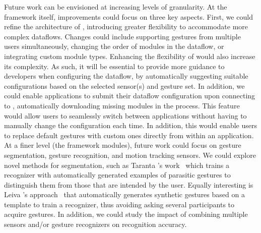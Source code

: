 Future work can be envisioned at increasing levels of granularity. 
%
At the framework itself, improvements could focus on three key aspects.
%
First, we could refine the architecture of \ql, introducing greater flexibility to accommodate more complex dataflows. Changes could include supporting gestures from multiple users simultaneously, changing the order of modules in the dataflow, or integrating custom module types.
%
Enhancing the flexibility of \ql would also increase its complexity. As such, it will be essential to provide more guidance to developers when configuring the dataflow, \eg by automatically suggesting suitable configurations based on the selected sensor(s) and gesture set.
%
In addition, we could enable applications to submit their dataflow configuration upon connecting to \ql, automatically downloading missing modules in the process. This feature would allow users to seamlessly switch between applications without having to manually change the configuration each time. In addition, this would enable users to replace default gestures with custom ones directly from within an application.
%
At a finer level (\ie the framework modules), future work could focus on gesture segmentation, gesture recognition, and motion tracking sensors. We could explore novel methods for segmentation, such as Taranta \etal's work~\cite{Taranta:2017} which trains a recognizer with automatically generated examples of parasitic gestures to distinguish them from those that are intended by the user. Equally interesting is Leiva \etal's approach~\cite{Leiva:2018} that automatically generates synthetic gestures based on a template to train a recognizer, thus avoiding asking several participants to acquire gestures. In addition, we could study the impact of combining multiple sensors and/or gesture recognizers on recognition accuracy.